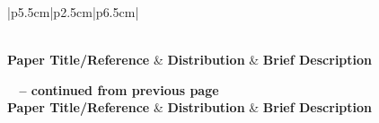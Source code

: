 \documentclass[12pt,a4paper]{article}
\begin{document}
\begin{longtable}{|p{5.5cm}|p{2.5cm}|p{6.5cm}|}
	\caption{The test statistics used by the research articles for hypothesis testing}
	\label{tab:StatisticalProperties} \\
	\hline
	\textbf{Paper Title/Reference} & \textbf{Distribution} & \textbf{Brief Description} \\
	\hline
	\endfirsthead
	
	{{\bfseries \tablename\ \thetable{} -- continued from previous page}} \\
	\hline
	\textbf{Paper Title/Reference} & \textbf{Distribution} & \textbf{Brief Description} \\
	\hline
	\endhead
	
	\hline {} \\
	\endfoot
	
	\hline
	\endlastfoot
	

\end{longtable}
\end{document}
